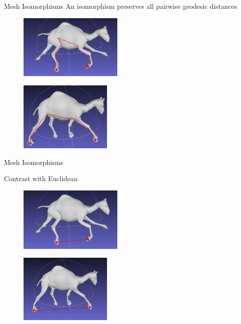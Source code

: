\documentclass{beamer}
\begin{document}
\begin{frame}{Mesh Isomorphisms}
An isomorphism preserves all pairwise geodesic distances

\begin{figure}[t]
    \includegraphics[width=0.45\textwidth]{camel1_geodesic.png}
\end{figure}

\begin{figure}[t]
    \includegraphics[width=0.4\textwidth]{camel2_geodesic.png}
\end{figure}

\end{frame}

\begin{frame}{Mesh Isomorphisms}

Contrast with Euclidean

\begin{figure}[t]
    \includegraphics[width=0.45\textwidth]{camel1_euclidean.png}
\end{figure}

\begin{figure}[t]
    \includegraphics[width=0.4\textwidth]{camel2_euclidean.png}
\end{figure}

\end{frame}
\end{document}
